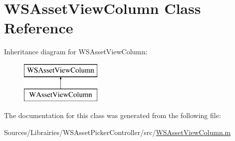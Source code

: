 \hypertarget{class_w_s_asset_view_column}{\section{W\-S\-Asset\-View\-Column Class Reference}
\label{class_w_s_asset_view_column}
}
Inheritance diagram for W\-S\-Asset\-View\-Column\-:\begin{figure}[H]
\begin{center}
\leavevmode
\includegraphics[height=2.000000cm]{class_w_s_asset_view_column}
\end{center}
\end{figure}


The documentation for this class was generated from the following file\-:\begin{DoxyCompactItemize}
\item 
Sources/\-Librairies/\-W\-S\-Asset\-Picker\-Controller/src/\hyperlink{_w_s_asset_view_column_8m}{W\-S\-Asset\-View\-Column.\-m}\end{DoxyCompactItemize}
